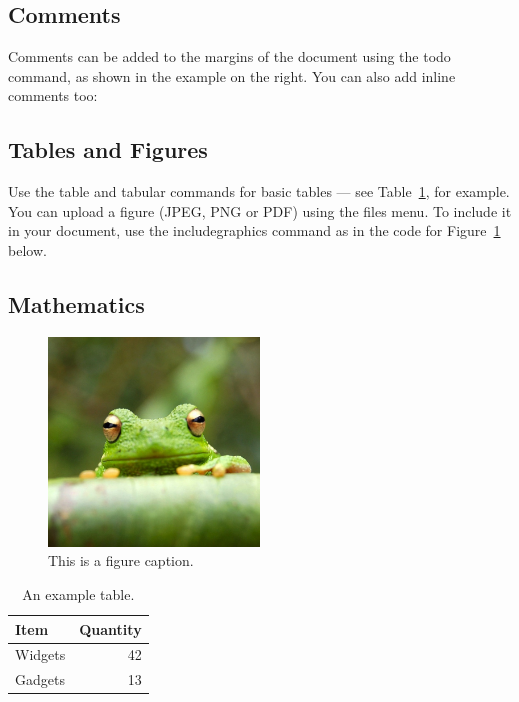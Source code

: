 \subsection{Comments}

Comments can be added to the margins of the document using the  todo command, as shown in the example on the right. You can also add inline comments too:


\subsection{Tables and Figures}

Use the table and tabular commands for basic tables --- see Table~\ref{tab:widgets}, for example. You can upload a figure (JPEG, PNG or PDF) using the files menu. To include it in your document, use the includegraphics command as in the code for Figure~\ref{fig:frog} below.

\subsection{Mathematics}

\begin{figure}
\centering
\includegraphics[width=0.5\textwidth]{frog.jpg}
\caption{\label{fig:frog}This is a figure caption.}
\end{figure}

\begin{table}
\centering
\begin{tabular}{l|r}
Item & Quantity \\\hline
Widgets & 42 \\
Gadgets & 13
\end{tabular}
\caption{\label{tab:widgets}An example table.}
\end{table}

